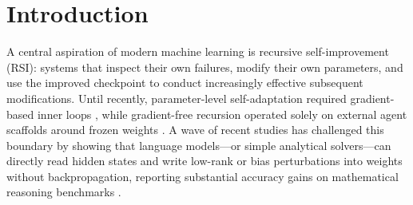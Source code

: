 \documentclass[10pt]{article}
\begin{document}
\begin{abstract}
Third, matched-$N$ diagnostics across all 40 MoE layers reveal a \textbf{Topic-Confounding Mirage} on both SuperGPQA-Hard and GPQA-Diamond: holding problem identity fixed collapses unpaired $C$-vs-$W$ residual separability by $\MirageSGRatioD$ and $\MirageGPQARatioD$ ($73\text{--}74\%$ topic confounding) and 256-expert MoE router SNR by $\MirageSGRatioSNR$ and $\MirageGPQARatioSNR$ ($71\text{--}77\%$ confounding), while reasoning and stopping subspaces remain nearly orthogonal ($|\cos|=\OrthResCos$ residual, $\OrthRtrCos$ router).
Finally, we identify a self-calibrated RL stopping barrier ($\mathrm{acc}|\mathrm{fin}=91\text{--}100\%$) and thinking-mode failure boundary (0.0\% rescue across $\Delta b_{dt}\in[+0.3,+1.6]$ on AIME 24--25 at 4,096 tokens), and release a native 4-bit transactional self-rewriting harness (\texttt{agent\_v2}) that runs a 35B-A3B MoE $3.5\text{--}4.5\times$ faster in $2.8\times$ less memory than BF16 14B, doubles diagnostic engagement to 100\%, cuts turn errors from 42.2\% to 17.6\%, and eliminates ghost edits and unthresholded drift.
\end{abstract}

\section{Introduction}
\label{sec:intro}

A central aspiration of modern machine learning is recursive self-improvement (RSI): systems that inspect their own failures, modify their own parameters, and use the improved checkpoint to conduct increasingly effective subsequent modifications. Until recently, parameter-level self-adaptation required gradient-based inner loops \citep{zweiger2025selfadapting}, while gradient-free recursion operated solely on external agent scaffolds around frozen weights \citep{zhang2025darwin}. A wave of recent studies has challenged this boundary by showing that language models---or simple analytical solvers---can directly read hidden states and write low-rank or bias perturbations into weights without backpropagation, reporting substantial accuracy gains on mathematical reasoning benchmarks \citep{fan2026selfrewriting,takehi2026sparks,khamis2026aha,fischetti2026sort,kundu2026samefix,zhang2026basersi}.
\end{document}
